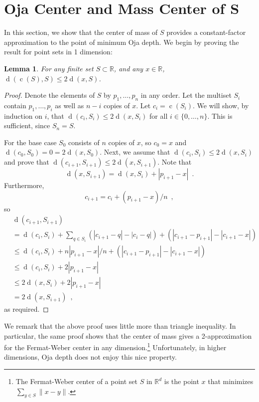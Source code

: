 \documentclass[preprint, 12pt]{elsarticle}
\newtheorem{lem}{Lemma}
\DeclareMathOperator{\od}{d}
\DeclareMathOperator{\cog}{c}
\newcommand{\R}{\mathbb{R}}
\begin{document}
\section{Oja Center and Mass Center of $\mathbf{S}$}
\label{sec:cnterofS}

In this section, we show that the center of mass of $S$ provides
a constant-factor approximation to the point of minimum Oja depth.
We begin by proving the result for point sets in 1 dimension:

\begin{lem}
\label{lem:grav1d}
For any finite set $S\subset\mathbb{R}$, and any $x\in\mathbb{\R}$, $\od(\cog(S),S) \le 2\od(x,S)$.
\end{lem}

\begin{proof}
Denote the elements of $S$ by $p_1,\ldots,p_n$ in any order.  Let the
multiset $S_i$ contain $p_1,\ldots,p_i$ as well as $n-i$ copies of
$x$. 
Let $c_i=\cog(S_i)$.
We will show, by induction on $i$, that $\od(c_i,S_i)\le
2\od(x,S_i)$ for all $i\in\{0,\ldots,n\}$.  This is sufficient,
since $S_n=S$.

For the base case $S_0$ consists of $n$ copies of $x$, so
$c_0=x$ and $\od(c_0,S_0)= 0 = 2\od(x,S_0)$.  Next,
we assume that $\od(c_i,S_i) \le 2\od(x,S_i)$ and prove that
$\od(c_{i+1},S_{i+1}) \le 2\od(x,S_{i+1})$.  Note that
\[
   \od(x,S_{i+1}) = \od(x,S_i) + |p_{i+1}-x| \enspace .
\]
Furthermore, 
\[
   c_{i+1} = c_i + (p_{i+1}-x)/n \enspace ,
\]
so
\begin{align*}
    &\od(c_{i+1}, S_{i+1}) \\
     & =  \od(c_i, S_{i}) 
        + \sum_{q\in S_i} (|c_{i+1} - q| - |c_i - q|) 
        + (|c_{i+1} - p_{i+1}| - |c_{i+1} - x|) \\
     & \le  \od(c_i, S_{i}) 
         + n|p_{i+1}-x|/n  
         + (|c_{i+1} - p_{i+1}| - |c_{i+1} - x|) \\
     & \le  \od(c_i, S_{i}) + 2|p_{i+1}-x|  \\
     & \le  2\od(x, S_{i}) 
             + 2|p_{i+1}-x|  \\
     &  =  2\od(x, S_{i+1}) \enspace ,
\end{align*}
as required.
\end{proof}

We remark that the above proof uses little more than triangle
inequality. In particular, the same proof shows that the center of
mass gives a 2-approximation for the Fermat-Weber center in any
dimension.\footnote{The Fermat-Weber center of a point set $S$ in $\R^d$
is the point $x$ that minimizes $\sum_{y\in S}\|x-y\|$.}  Unfortunately,
in higher dimensions, Oja depth does not enjoy this nice property.
\end{document}
